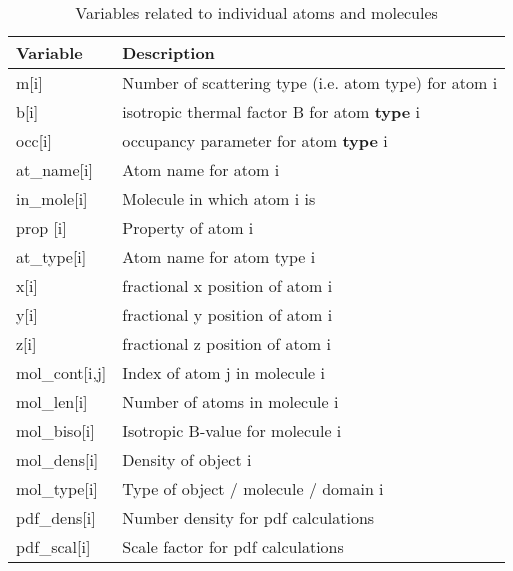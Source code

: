 \begin{table}[!tbh]
\centering
\begin{tabularx}{\textwidth}{|p{30mm}|X|}
  \hline
  {\bf Variable} & {\bf Description} \\
  \hline\hline
  m[i]   & Number of scattering type (i.e. atom type) for atom i \\
  b[i]   & isotropic thermal factor B for atom {\bf type} i \\
  occ[i]   & occupancy parameter for atom {\bf type} i \\
  at\_name[i] & Atom name for atom i\\
  in\_mole[i] & Molecule in which atom i is \\
  prop    [i] & Property of atom i \\
  \hline
  at\_type[i] & Atom name for atom type i\\
  \hline
  x[i]   & fractional x position of atom i \\
  y[i]   & fractional y position of atom i \\ 
  z[i]   & fractional z position of atom i \\
  \hline\hline
  mol\_cont[i,j] & Index of atom j in molecule i \\
  mol\_len[i]    & Number of atoms in molecule i \\
  mol\_biso[i]   & Isotropic B-value for molecule i\\
  mol\_dens[i]   & Density of object i \\
  mol\_type[i]   & Type of object / molecule / domain i \\ 
  \hline\hline
  pdf\_dens[i]   & Number density for pdf calculations \\
  pdf\_scal[i]   & Scale factor   for pdf calculations \\
  \hline
\end{tabularx}
\caption{\label{v2-tab}Variables related to individual atoms and
         molecules}
\end{table}

